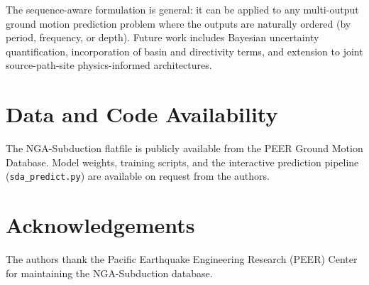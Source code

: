 \documentclass[12pt,a4paper]{article}
\begin{document}
The sequence-aware formulation is general: it can be applied to any multi-output
ground motion prediction problem where the outputs are naturally ordered (by
period, frequency, or depth).
Future work includes Bayesian uncertainty quantification, incorporation of basin
and directivity terms, and extension to joint source-path-site physics-informed
architectures.

\section*{Data and Code Availability}

The NGA-Subduction flatfile is publicly available from the PEER Ground Motion
Database.
Model weights, training scripts, and the interactive prediction pipeline
(\texttt{sda\_predict.py}) are available on request from the authors.

\section*{Acknowledgements}

The authors thank the Pacific Earthquake Engineering Research (PEER) Center for
maintaining the NGA-Subduction database.
\end{document}
